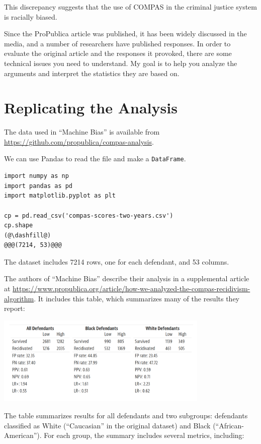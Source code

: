 This discrepancy suggests that the use of COMPAS in the criminal justice
system is racially biased.

Since the ProPublica article was published, it has been widely discussed
in the media, and a number of researchers have published responses. In
order to evaluate the original article and the responses it provoked,
there are some technical issues you need to understand. My goal is to
help you analyze the arguments and interpret the statistics they are
based on.

\hypertarget{replicating-the-analysis}{%
\section{Replicating the Analysis}\label{replicating-the-analysis}}

The data used in ``Machine Bias'' is available from
\url{https://github.com/propublica/compas-analysis}.

We can use Pandas to read the file and make a
\passthrough{\lstinline!DataFrame!}.

\begin{lstlisting}[]
import numpy as np
import pandas as pd
import matplotlib.pyplot as plt

cp = pd.read_csv('compas-scores-two-years.csv')
cp.shape
(@\dashfill@)
@@@(7214, 53)@@@
\end{lstlisting}

The dataset includes 7214 rows, one for each defendant, and 53 columns.

The authors of ``Machine Bias'' describe their analysis in a
supplemental article at
\url{https://www.propublica.org/article/how-we-analyzed-the-compas-recidivism-algorithm}.
It includes this table, which summarizes many of the results they
report:

\includegraphics[width=4in]{chapters/figs/machine_bias_table.png}

The table summarizes results for all defendants and two subgroups:
defendants classified as White (``Caucasian'' in the original dataset)
and Black (``African-American''). For each group, the summary includes
several metrics, including:

